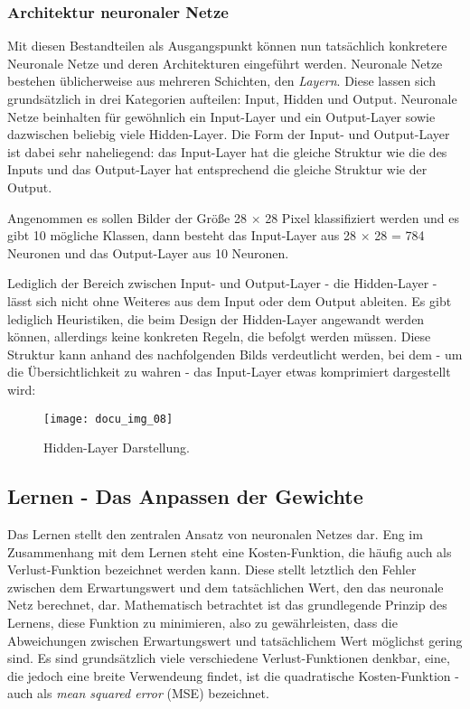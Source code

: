 \subsubsection{Architektur neuronaler Netze}

Mit diesen Bestandteilen als Ausgangspunkt können nun tatsächlich konkretere Neuronale Netze und deren Architekturen eingeführt werden. Neuronale Netze bestehen üblicherweise aus mehreren Schichten, den \textit{Layern}. Diese lassen sich grundsätzlich in drei Kategorien aufteilen: Input, Hidden und Output. Neuronale Netze beinhalten für gewöhnlich ein Input-Layer und ein Output-Layer sowie dazwischen beliebig viele Hidden-Layer. Die Form der Input- und Output-Layer ist dabei sehr naheliegend: das Input-Layer hat die gleiche Struktur wie die des Inputs und das Output-Layer hat entsprechend die gleiche Struktur wie der Output.

Angenommen es sollen Bilder der Größe 28 \(\times\) 28 Pixel klassifiziert werden und es gibt 10 mögliche Klassen, dann besteht das Input-Layer aus 28 \(\times\) 28 = 784 Neuronen und das Output-Layer aus 10 Neuronen.

Lediglich der Bereich zwischen Input- und Output-Layer - die Hidden-Layer - lässt sich nicht ohne Weiteres aus dem Input oder dem Output ableiten. Es gibt lediglich Heuristiken, die beim Design der Hidden-Layer angewandt werden können, allerdings keine konkreten Regeln, die befolgt werden müssen. Diese Struktur kann anhand des nachfolgenden Bilds verdeutlicht werden, bei dem - um die Übersichtlichkeit zu wahren - das Input-Layer etwas komprimiert dargestellt wird:


\begin{figure}[H]
    \centering
    \texttt{[image: docu\_img\_08]}
    \caption{Hidden-Layer Darstellung.}
    \label{fig:hidden-layers}
\end{figure}

\subsection{Lernen - Das Anpassen der Gewichte}

Das Lernen stellt den zentralen Ansatz von neuronalen Netzes dar. Eng im Zusammenhang mit dem Lernen steht eine
Kosten-Funktion, die häufig auch als Verlust-Funktion bezeichnet werden kann. Diese stellt letztlich den Fehler zwischen
dem Erwartungswert und dem tatsächlichen Wert, den das neuronale Netz berechnet, dar. Mathematisch betrachtet ist das
grundlegende Prinzip des Lernens, diese Funktion zu minimieren, also zu gewährleisten, dass die Abweichungen zwischen
Erwartungswert und tatsächlichem Wert möglichst gering sind. Es sind grundsätzlich viele verschiedene Verlust-Funktionen
denkbar, eine, die jedoch eine breite Verwendeung findet, ist die quadratische Kosten-Funktion - auch als \textit{mean squared
error} (MSE) bezeichnet.

